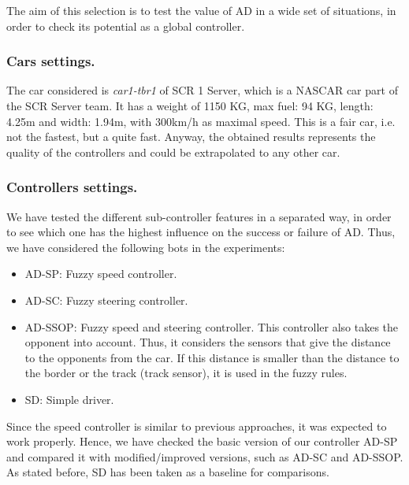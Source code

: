 \documentclass[runningheads,a4paper]{llncs}
\begin{document}
	The aim of this selection is to test the value of AD in a wide set of situations, in order to check its potential as a global controller.
	
	
	
	\subsubsection{Cars settings.}
	
	The car considered is \textit{car1-tbr1} of SCR 1 Server, which is a NASCAR car part of the SCR Server team. It has a weight of 1150 KG, max fuel: 94 KG, length: 4.25m and width: 1.94m, with 300km/h as maximal speed.
	This is a fair car, i.e. not the fastest, but a quite fast. Anyway, the obtained results represents the quality of the controllers and could be extrapolated to any other car.
	
	
	\subsubsection{Controllers settings.}
	
	We have tested the different sub-controller features in a separated way, in order to see which one has the highest influence on the success or failure of
	AD. Thus, we have considered the following bots in the experiments:
	
	\begin{itemize}
		\item AD-SP: Fuzzy speed controller. 
		\item AD-SC: Fuzzy steering controller.
		\item AD-SSOP: Fuzzy speed and steering controller.
		This controller also takes the opponent into account. Thus, it considers the sensors that give the distance to the opponents from the car. If this distance is smaller than the distance to the border or the track (track sensor), it is used in the fuzzy rules.
		\item SD: Simple driver.
	\end{itemize}
	
	Since the speed controller is similar to previous approaches, it was expected to work properly. Hence, we have checked the basic version of our controller AD-SP and compared it with modified/improved versions, such as AD-SC and AD-SSOP.
	As stated before, SD has been taken as a baseline for comparisons.
	
\end{document}
